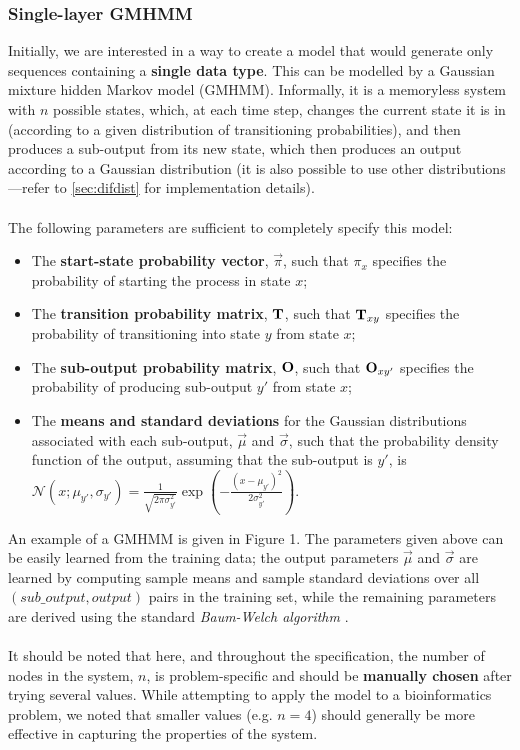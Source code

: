 \documentclass[12pt,openany]{article}
\begin{document}
	\subsubsection{Single-layer GMHMM}
	
	Initially, we are interested in a way to create a model that would generate only sequences containing a {\bf single data type}. This can be modelled by a Gaussian mixture hidden Markov model (GMHMM). Informally, it is a memoryless system with $n$ possible states, which, at each time step, changes the current state it is in (according to a given distribution of transitioning probabilities), and then produces a sub-output from its new state, which then produces an output according to a Gaussian distribution (it is also possible to use other distributions---refer to \cref{sec:difdist} for implementation details).\\ \\
	The following parameters are sufficient to completely specify this model:
	\begin{itemize}
		\item The \textbf{start-state probability vector}, $\vec{\pi}$, such that $\pi_x$ specifies the probability of starting the process in state $x$;
		\item The \textbf{transition probability matrix}, $\bf T$, such that ${\bf T}_{xy}$ specifies the probability of transitioning into state $y$ from state $x$;
		\item The \textbf{sub-output probability matrix}, $\bf O$, such that ${\bf O}_{xy'}$ specifies the probability of producing sub-output $y'$ from state $x$;
		\item The \textbf{means and standard deviations} for the Gaussian distributions associated with each sub-output, $\vec{\mu}$ and $\vec{\sigma}$, such that the probability density function of the output, assuming that the sub-output is $y'$, is $\mathcal{N}(x; \mu_{y'}, \sigma_{y'}) = \frac{1}{\sqrt{2\pi\sigma_{y'}^2}}\exp\left(-\frac{(x - \mu_{y'})^2}{2\sigma_{y'}^2}\right)$.
	\end{itemize}
	An example of a GMHMM is given in Figure 1. The parameters given above can be easily learned from the training data; the output parameters $\vec{\mu}$ and $\vec{\sigma}$ are learned by computing sample means and sample standard deviations over all $(sub\_output, output)$ pairs in the training set, while the remaining parameters are derived using the standard \emph{Baum-Welch algorithm} \cite{Rabiner89}.\\ \\
	It should be noted that here, and throughout the specification, the number of nodes in the system, $n$, is problem-specific and should be {\bf manually chosen} after trying several values. While attempting to apply the model to a bioinformatics problem, we noted that smaller values (e.g. $n = 4$) should generally be more effective in capturing the properties of the system.
	
\end{document}
